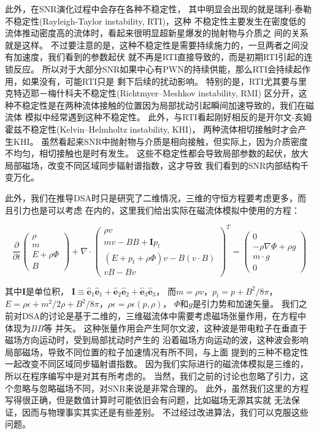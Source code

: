 此外，在SNR演化过程中会存在各种不稳定性，
其中明显会出现的就是瑞利-泰勒不稳定性(Rayleigh-Taylor instability, RTI)，这种
不稳定性主要发生在密度低的流体推动密度高的流体时，看起来很明显超新星爆发的抛射物与介质之
间的关系就是这样。
不过要注意的是，这种不稳定性是需要持续施力的，一旦两者之间没有加速度，我们看到的参数起伏
就不再是RTI直接导致的，而是初期RTI引起的连锁反应。
所以对于大部分SNR如果中心有PWN的持续供能，那么RTI会持续起作用，如果没有，可能RTI只是
剩下后续的扰动影响。
特别的是，RTI尤其要与里克特迈耶－梅什科夫不稳定性(Richtmyer–Meshkov instability, RMI)
区分开，这种不稳定性是在两种流体接触的位置因为局部扰动引起瞬间加速导致的，我们在磁流体
模拟中经常遇到这种不稳定性。
此外，与RTI看起刚好相反的是开尔文-亥姆霍兹不稳定性(Kelvin–Helmholtz instability, KHI)，
两种流体相切接触时才会产生KHI。
虽然看起来SNR中抛射物与介质是相向接触，但实际上，因为介质密度不均匀，相切接触也是时有发生。
这些不稳定性都会导致局部参数的起伏，放大局部磁场，改变不同区域同步辐射谱指数，这才导致
我们看到的SNR内部结构千变万化。

此外，我们在推导DSA时只是研究了二维情况，三维的守恒方程要考虑更多，而且引力也是可以考虑
在内的，这里我们给出实际在磁流体模拟中使用的方程：

\begin{equation}
\frac{\partial}{\partial t} \left( \begin{array}{c}{\rho} \\ {m} \\ {E+\rho \Phi}
\\ {B}\end{array}\right)+\nabla \cdot \left( \begin{array}{c}{\rho v} \\
{m v-B B+\mathbf{I} p_{t}} \\ {\left(E+p_{t}+\rho \Phi\right) v-B(v \cdot B)}
\\ {v B-B v}\end{array}\right)^{T}=\left( \begin{array}{c}{0} \\
{-\rho \nabla \Phi+\rho g} \\ {m \cdot g} \\ {0}\end{array}\right)
\end{equation}

其中$\mathbf{I}$是单位积，
$\mathbf{I} \equiv \hat{\boldsymbol{e}}_{1} \hat{\boldsymbol{e}}_{1}+
\hat{\boldsymbol{e}}_{2} \hat{\boldsymbol{e}}_{2}+\hat{\boldsymbol{e}}_{3}
\hat{\boldsymbol{e}}_{3}$， 而${m}=\rho {v}$，$p_{t}=p+B^{2} / 8\pi$，
$E=\rho \epsilon+m^{2}/2 \rho+B^{2}/8\pi$，$\rho \epsilon=\rho \epsilon(p, \rho)$，
$\Phi$和$g$是引力势和加速矢量。
我们之前对DSA的讨论是基于二维的，三维磁流体中需要考虑磁场张量作用，在方程中体现为$BB$等
并矢。
这种张量作用会产生阿尔文波，这种波是带电粒子在垂直于磁场方向运动时，受到局部扰动时产生的
沿着磁场方向运动的波，这种波会影响局部磁场，导致不同位置的粒子加速情况有所不同，与上面
提到的三种不稳定性一起改变不同区域同步辐射谱指数。
因为我们实际进行的磁流体模拟是三维的，所以在程序编写中是对其有所考虑的。
当然，我们之前的讨论也忽略了引力，这个忽略与忽略磁场不同，对SNR来说是非常合理的。
此外，虽然我们这里的方程写得很正确，但是数值计算时可能依旧会有问题，比如磁场无源其实就
无法保证，因而与物理事实其实还是有些差别。
不过经过改进算法，我们可以克服这些问题。
